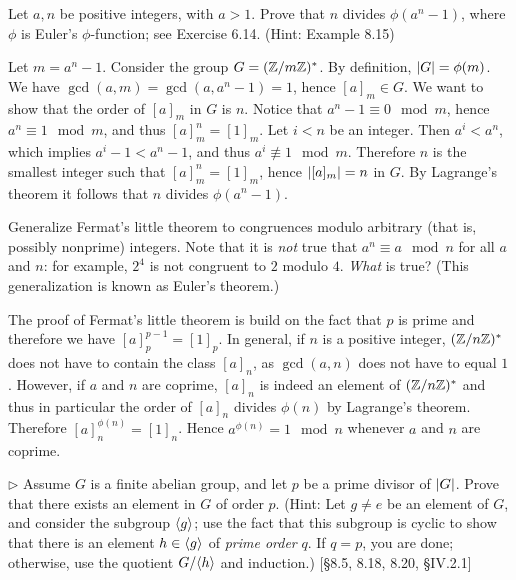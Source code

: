 \begin{problem}
	Let $a, n$ be positive integers, with $a > 1$. Prove that $n$ divides $\phi(a^n - 1)$, where $\phi$ is Euler's $\phi$-function; see Exercise 6.14. (Hint: Example 8.15)
\end{problem}

\begin{solution}
	Let $m = a^n - 1$. Consider the group $G = (\mathbb{Z}/m\mathbb{Z})^*$. By definition, $\left|G\right| = \phi(m)$. We have $\gcd(a, m) = \gcd(a, a^n - 1) = 1$, hence $[a]_m \in G$. We want to show that the order of $[a]_m$ in $G$ is $n$. Notice that $a^n - 1 \equiv 0 \mod m$, hence $a^n \equiv 1 \mod m$, and thus $[a]_m^n = [1]_m$. Let $i < n$ be an integer. Then $a^i < a^n$, which implies $a^i - 1 < a^n - 1$, and thus $a^i \not \equiv 1 \mod m$. Therefore $n$ is the smallest integer such that $[a]_m^n = [1]_m$, hence $\left|[a]_m\right| = n$ in $G$. By Lagrange's theorem it follows that $n$ divides $\phi(a^n - 1)$.
\end{solution}

\begin{problem}
	Generalize Fermat's little theorem to congruences modulo arbitrary (that is, possibly nonprime) integers. Note that it is \emph{not} true that $a^n \equiv a \mod n$ for all $a$ and $n$: for example, $2^4$ is not congruent to $2$ modulo $4$. \emph{What} is true? (This generalization is known as Euler's theorem.)
\end{problem}

\begin{solution}
	The proof of Fermat's little theorem is build on the fact that $p$ is prime and therefore we have $[a]_p^{p-1} = [1]_p$. In general, if $n$ is a positive integer, $(\mathbb{Z}/n\mathbb{Z})^*$ does not have to contain the class $[a]_n$, as $\gcd(a, n)$ does not have to equal $1$. However, if $a$ and $n$ are coprime, $[a]_n$ is indeed an element of $(\mathbb{Z}/n\mathbb{Z})^*$ and thus in particular the order of $[a]_n$ divides $\phi(n)$ by Lagrange's theorem. Therefore $[a]_n^{\phi(n)} = [1]_n$. Hence $a^{\phi(n)} = 1 \mod n$ whenever $a$ and $n$ are coprime.
\end{solution}

\begin{problem}
	$\triangleright$ Assume $G$ is a finite abelian group, and let $p$ be a prime divisor of $\left|G\right|$. Prove that there exists an element in $G$ of order $p$. (Hint: Let $g \neq e$ be an element of $G$, and consider the subgroup $\langle g \rangle$; use the fact that this subgroup is cyclic to show that there is an element $h \in \langle g \rangle$ of \emph{prime order} $q$. If $q = p$, you are done; otherwise, use the quotient $G/\langle h \rangle$ and induction.) [\S8.5, 8.18, 8.20, \S IV.2.1]
\end{problem}

